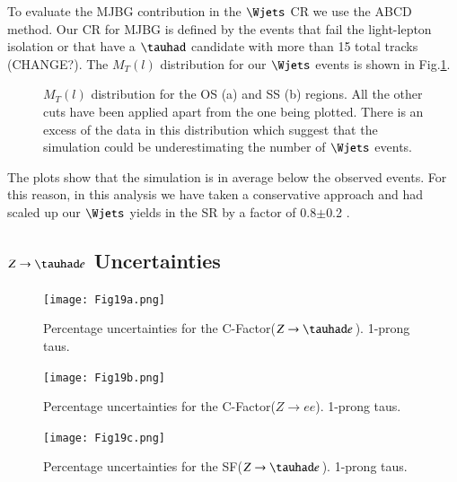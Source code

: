 To evaluate the MJBG contribution in the $\Wjets$ CR we use the ABCD method. Our CR for MJBG is defined by the events that fail the light-lepton isolation or that have a $\tauhad$ candidate with more than 15 total tracks (CHANGE?). The  $M_T(l)$ distribution for our $\Wjets$ events is shown in Fig.\ref{Fig8}. 
\begin{figure}[htbp]
	\centering
	\hfill
	\caption{$M_T(l)$ distribution for the OS (a) and SS (b) regions. All the other cuts have been applied apart from the one being plotted. There is an excess of the data in this distribution which suggest that the simulation could be underestimating the number of $\Wjets$ events.}
	\label{Fig8}
\end{figure} 
The plots show that the simulation is in average below the observed events. For this reason, in this analysis we have taken a conservative approach and had scaled up our $\Wjets$ yields in the SR by a factor of 0.8$\pm$0.2 .

\subsection{$Z\to\tauhad e$ Uncertainties}\label{zteuncer}
\begin{figure}[htbp]
	\centering
	\texttt{[image: Fig19a.png]}
	\caption{Percentage uncertainties for the C-Factor($Z\to\tauhad e$). 1-prong taus.}
	\label{Fig19a}
\end{figure}
\begin{figure}[htbp]
	\centering
	\texttt{[image: Fig19b.png]}
	\caption{Percentage uncertainties for the C-Factor($Z\to ee$). 1-prong taus.}
	\label{Fig19b}
\end{figure}
\begin{figure}[htbp]
	\centering
	\texttt{[image: Fig19c.png]}
	\caption{Percentage uncertainties for the SF($Z\to\tauhad e$). 1-prong taus.}
	\label{Fig19c}
\end{figure}

